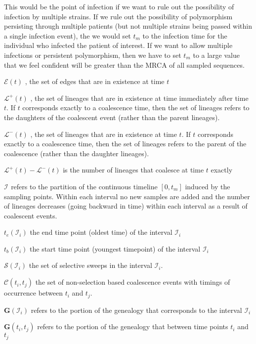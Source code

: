 \documentclass[letterpaper]{article}
\newcommand{\genealogy}{{\ensuremath{\mathbf{G}}}}
\newcommand{\edgesAt}{{\ensuremath{\mathcal{E}}}}
\newcommand{\lineagesAfter}{{\ensuremath{\mathcal{L}^{+}}}}
\newcommand{\lineagesBefore}{{\ensuremath{\mathcal{L}^{-}}}}
\newcommand{\interval}[1]{{\ensuremath{\mathcal{I}_{#1}}}}
\newcommand{\intervalEnd}[1]{{\ensuremath{t_e(\interval{#1})}}}
\newcommand{\intervalBeg}[1]{{\ensuremath{t_b(\interval{#1})}}}
\newcommand{\entireSweepSet}{{\ensuremath{\mathcal{S}}}}
\newcommand{\sweepset}[1]{{\ensuremath{\entireSweepSet({#1})}}}
\newcommand{\coalescences}[2]{{\ensuremath{\mathcal{C}({#1},{#2})}}}
\begin{document}
\begin{compactitem}
	This would be the point of infection if we want to rule out the possibility of infection by multiple strains. 	If we rule out the possibility of polymorphism persisting through multiple patients (but not multiple strains being passed within a single infection event), the we would set $t_m$ to the infection time for the individual who infected the patient of interest.
	If we want to allow multiple infections or persistent polymorphism, then we have to set $t_m$ to a large value that we feel confident will be greater than the MRCA of all sampled sequences.
	\item[$\edgesAt(t)$], the set of edges that are in existence at time $t$
	\item[$\lineagesAfter(t)$], the set of lineages that are in existence at time immediately after time $t$. If $t$ corresponds exactly to a coalescence time, then the set of lineages refers to the daughters of the coalescent event (rather than the parent lineages).
	\item[$\lineagesBefore(t)$], the set of lineages that are in existence at time $t$. If $t$ corresponds exactly to a coalescence time, then the set of lineages refers to the parent of the coalescence (rather than the daughter lineages).
 	 \item[$\lineagesAfter(t)-\lineagesBefore(t)$] is the number of lineages that coalesce at time $t$ exactly
	\item[$\interval{}$] refers to the partition of the continuous timeline $[0,t_m]$ induced by the sampling points. Within each interval no new samples are added and the number of lineages decreases (going backward in time)  within each interval as a result of coalescent events.
	\item[$\intervalEnd{i}$] the end time point (oldest time) of the interval $\interval{i}$
	\item[$\intervalBeg{i}$] the start time point (youngest timepoint) of the interval $\interval{i}$
	\item[$\sweepset{\interval{i}}$] the set of selective sweeps in the interval $\interval{i}$.
	\item[$\coalescences{t_i}{t_j}$] the set of non-selection based coalescence events with timings of occurrence between $t_i$ and $t_j$.
	\item[$\genealogy(\interval{i})$] refers to the portion of the genealogy that corresponds to the interval $\interval{i}$
	\item[$\genealogy(t_i, t_j)$] refers to the portion of the genealogy that between time points $t_i$ and $t_j$

\end{compactitem}
\end{document}
